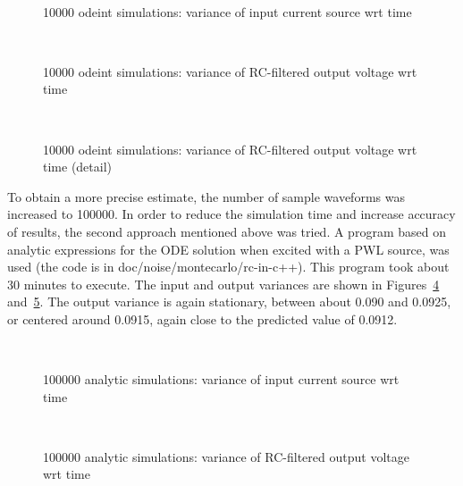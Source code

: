 \begin{figure}[htbp]
\centerline{\ }
\caption{10000 {\sf odeint} simulations: variance of input current source wrt time}
\label{fig:iin-odeint-rc}
\end{figure}
\begin{figure}[htbp]
\centerline{\ }
\caption{10000 {\sf odeint} simulations: variance of RC-filtered output voltage wrt time}
\label{fig:v1-odeint-rc-wide}
\end{figure}
\begin{figure}[htbp]
\centerline{\ }
\caption{10000 {\sf odeint} simulations: variance of RC-filtered output
		voltage wrt time (detail)}
\label{fig:v1-odeint-rc-narrow}
\end{figure}

To obtain a more precise estimate, the number of sample waveforms was
increased to 100000. In order to reduce the simulation time and increase
accuracy of results, the second approach mentioned above was tried.  A
program based on analytic expressions for the ODE solution when excited with
a PWL source, was used (the code is in {\sf doc/noise/montecarlo/rc-in-c++}).
This program took about 30 minutes to execute. The input and output
variances are shown in Figures~\ref{fig:iin-analytic-rc}
and~\ref{fig:v1-analytic-rc}. The output variance is again stationary,
between about 0.090 and 0.0925, or centered around 0.0915, again close to
the predicted value of 0.0912.

\begin{figure}[htbp]
\centerline{\ }
\caption{100000 analytic simulations: variance of input current source wrt time}
\label{fig:iin-analytic-rc}
\end{figure}
\begin{figure}[htbp]
\centerline{\ }
\caption{100000 analytic simulations: variance of RC-filtered output voltage wrt time}
\label{fig:v1-analytic-rc}
\end{figure}

